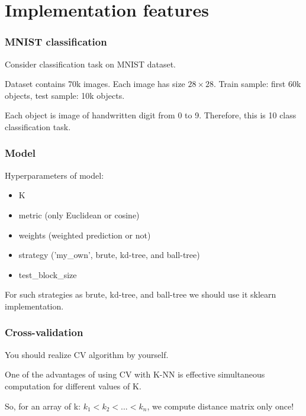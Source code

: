 \documentclass{beamer}
\begin{document}
	\section{Implementation features}
	\begin{frame}
		\frametitle{MNIST classification}
		
		Consider classification task on MNIST dataset. 
		
		Dataset contains 70k images. Each image has size $28\times 28$. Train sample: first 60k objects, test sample: 10k objects.
		
		Each object is image of handwritten digit from 0 to 9. Therefore, this is 10 class classification task.
		
	\end{frame}

	\begin{frame}
		\frametitle{Model}
		
		Hyperparameters of model:
		\begin{itemize}
			\item K
			\item metric (only Euclidean or cosine)
			\item weights (weighted prediction or not)
			\item strategy ('my\_own', brute, kd-tree, and ball-tree)
			\item test\_block\_size
		\end{itemize}
	
	For such strategies as brute, kd-tree, and ball-tree we should use it sklearn implementation.
		
	\end{frame}

	\begin{frame}
		\frametitle{Cross-validation}
		
		You should realize CV algorithm by yourself.
		
		One of the advantages of using CV with K-NN is effective simultaneous computation for different values of K.
		
		So, for an array of k: $k_1 < k_2 < ... < k_n$, we compute distance matrix only once!
		
	\end{frame}
\end{document}
